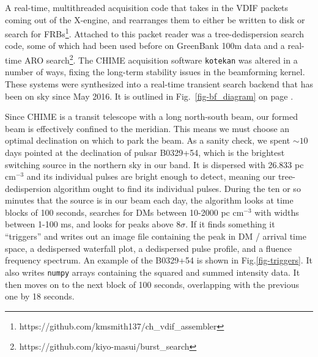 A real-time, multithreaded acquisition code that takes in the VDIF 
packets coming out of the X-engine, and rearranges them to either be written to disk or search for 
FRBs\footnote{https://github.com/kmsmith137/ch\_vdif\_assembler}. Attached 
to this packet reader was a tree-dedispersion search code, some of 
which had been used before on GreenBank 100m data and a real-time ARO 
search\footnote{https://github.com/kiyo-masui/burst\_search}.
The CHIME acquisition software {\tt kotekan} was 
altered in a number of ways, fixing the long-term 
stability issues in the beamforming kernel. These systems 
were synthesized into a real-time transient search backend 
that has been on sky since May 2016. 
It is outlined in Fig.~\ref{fig-bf_diagram}
on page \pageref{fig-bf_diagram}. 

Since CHIME is a transit telescope with a long north-south beam, 
our formed beam is effectively confined to the meridian. This means
we must choose an optimal declination on which 
to park the beam. As a sanity check, we spent $\sim10$ 
days pointed 
at the declination of pulsar B0329+54, which is the 
brightest switching source in the northern sky in our band. It 
is dispersed with 26.833 pc cm$^{-3}$ and its individual 
pulses are bright enough to detect, meaning our tree-dedispersion 
algorithm ought to find its individual pulses. During the 
ten or so minutes that the source is in our beam each day, 
the algorithm looks at time blocks of 100 seconds, searches 
for DMs between 10-2000 pc cm$^{-3}$ with widths between 
1-100 ms, and looks for peaks above 8$\sigma$. If it finds something
it ``triggers'' and writes out an image file containing the peak 
in DM / arrival time space, a dedispersed waterfall plot, a dedispersed 
pulse profile, and a fluence frequency spectrum. An example 
of the B0329+54 is shown in Fig.\ref{fig-triggers}. It also 
writes {\tt numpy} arrays containing the squared and summed 
intensity data. It then moves on to the next block of 100 seconds, 
overlapping with the previous one by 18 seconds. 







